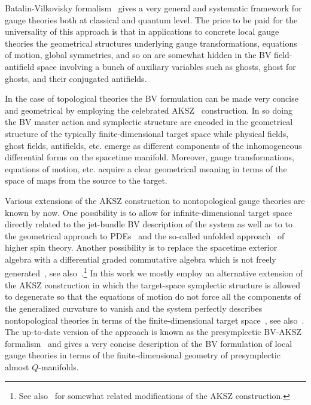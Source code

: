\documentclass[a4paper,12pt]{article}
\numberwithin{equation}{section} %
\numberwithin{equation}{section}
\begin{document}
Batalin-Vilkovisky formalism~\cite{Batalin:1981jr,Batalin:1983wj} gives a very general and systematic framework for gauge theories both at classical and quantum level. The price to be paid for the universality of this approach is that in applications to concrete local gauge theories the geometrical structures underlying gauge transformations, equations of motion, global symmetries, and so on are somewhat hidden in the BV field-antifield space involving a bunch of auxiliary variables such as ghosts, ghost for ghosts, and their conjugated antifields.

In the case of topological theories the BV formulation can be made very concise and geometrical by employing the celebrated  AKSZ~\cite{Alexandrov:1995kv} construction. In so doing the BV master action and symplectic structure are encoded in the geometrical structure of the typically finite-dimensional target space while  physical fields, ghost fields, antifields, etc. emerge as different components of the inhomogeneous differential forms on the spacetime manifold. Moreover, gauge transformations, equations of motion, etc. acquire  a clear geometrical meaning in terms of the space of maps from the source to the target.

Various extensions of the AKSZ construction to nontopological gauge theories are known by now. One possibility is to allow for infinite-dimensional target space~\cite{Barnich:2006hbb,Barnich:2010sw,Grigoriev:2010ic,Grigoriev:2012xg} directly related to the jet-bundle BV description of the system as well as to to the geometrical approach to PDEs~\cite{Vinogradov1981,Krasil?shchik-Lychagin-Vinogradov,Krasil'shchik:2010ij} and the so-called unfolded approach~\cite{Vasiliev:1988xc,Vasiliev:2005zu} of higher spin theory. Another possibility is to replace the spacetime exterior algebra with a differential graded commutative algebra which is not freely generated~\cite{Bonechi:2009kx,costello2011renormalization,Bonechi:2022aji}, see also~\cite{Costello:2016mgj,Cederwall:2023wxc}.\footnote{See also~\cite{Cattaneo:2023cnt,Arvanitakis:2024dbu,Borsten:2024alh} for somewhat related modifications of the AKSZ construction.}  In this work we mostly employ an alternative extension of the AKSZ construction in which the target-space symplectic structure is allowed to degenerate so that the equations of motion do not force all the components of the generalized curvature to vanish and the system perfectly describes nontopological theories in terms of the finite-dimensional target space~\cite{Alkalaev:2013hta,Grigoriev:2016wmk,Grigoriev:2020xec}, see also~\cite{Sharapov:2021drr,Dneprov:2022jyn,Grigoriev:2024ecv}. The up-to-date version of the approach is known as the presymplectic BV-AKSZ formalism~\cite{Grigoriev:2022zlq,Dneprov:2024cvt} and gives a very concise description of the BV formulation of local gauge theories in terms of the finite-dimensional geometry of presymplectic almost $Q$-manifolds.  
\end{document}
